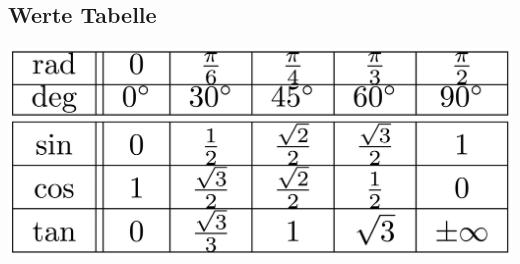 \subsection{Werte Tabelle}
    \begin{center}
        \includegraphics[width=0.7\linewidth]{src/Trigonometrie/trigo_tabelle.pdf}
    \end{center}
